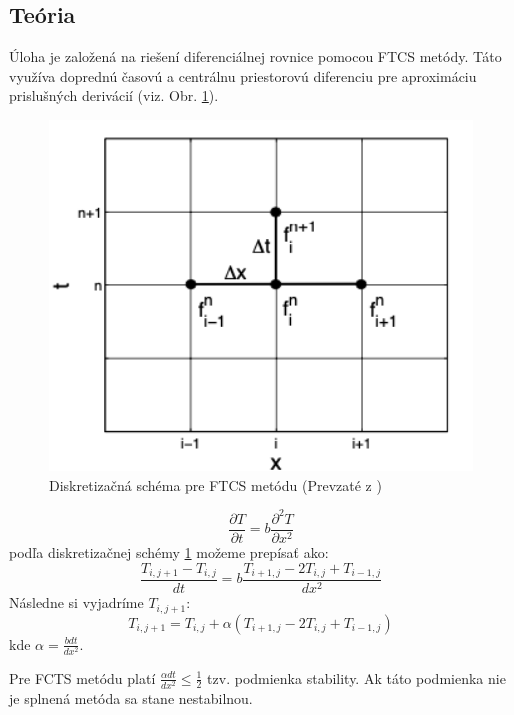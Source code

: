 \documentclass{article}
\theoremstyle{definition}
\theoremstyle{remark}
\begin{document}
\subsection{Teória}\label{sec:nothing}
Úloha je založená na riešení diferenciálnej rovnice pomocou FTCS metódy. Táto využíva doprednú časovú a centrálnu priestorovú diferenciu pre aproximáciu prislušných derivácií (viz. Obr. \ref{diskretizacia})\cite{Zukovic}. 
\begin{figure}
    \centering
    \includegraphics[width=1\textwidth]{ftcs.png}
    \caption{Diskretizačná schéma pre FTCS metódu (Prevzaté z \cite{Zukovic})}
    \label{diskretizacia}
\end{figure}


\begin{equation}
    \frac{\partial T}{\partial t} = b \frac{\partial^2 T}{\partial x^2}
\end{equation}
podľa diskretizačnej schémy \ref{diskretizacia} možeme prepísať ako:
\begin{equation}
\frac{T_{i,j+1}-T_{i,j}}{dt} = b \frac{T_{i+1,j}-2T_{i,j}+T_{i-1,j}}{dx^2}
\end{equation}
Následne si vyjadríme $T_{i,j+1}$:
\begin{equation}
    T_{i,j+1} = T_{i,j} + \alpha (T_{i+1,j} - 2T_{i,j} + T_{i-1,j})
\end{equation}
kde $\alpha = \frac{b dt}{dx^2}$. 


Pre FCTS metódu platí $\frac{\alpha dt}{dx^2} \leq  \frac{1}{2}$ tzv. podmienka stability. Ak táto podmienka nie je splnená metóda sa stane nestabilnou.
\end{document}
